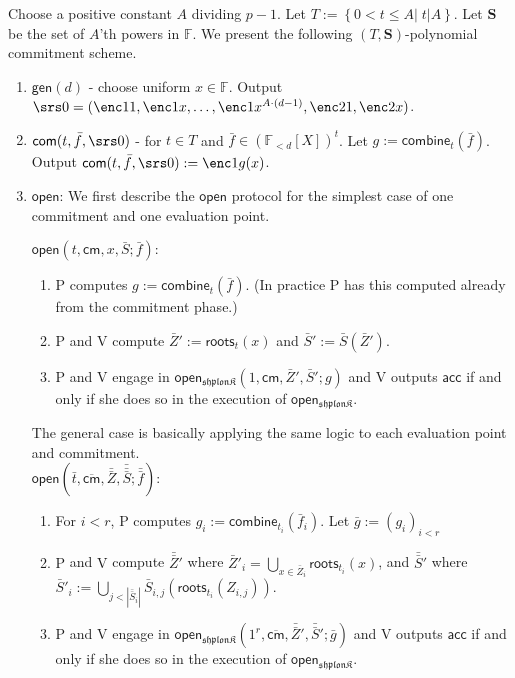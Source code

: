 \documentclass[11pt]{article} %
\newcommand{\F}{\ensuremath{\mathbb F}\xspace}
\newcommand{\vecc}[2]{\ensuremath{(#1)_{#2}}\xspace}
\newcommand{\com}{\ensuremath{\mathsf{com}}\xspace}
\newcommand{\cm}{\ensuremath{\mathsf{cm}}\xspace}
\newcommand{\cmm}{\ensuremath{\mathsf{\overline{cm}}}\xspace}
\newcommand{\open}{\ensuremath{\mathsf{open}}\xspace}
\newcommand{\acc}{\ensuremath{\mathsf{acc}}\xspace}
\newcommand{\defeq}{:=}
\newcommand{\gen}{\ensuremath{\mathsf{gen}}\xspace}
\newcommand{\prvpc}{\ensuremath{\mathrm{P}}\xspace}%
\newcommand{\verpc}{\ensuremath{\mathrm{V}}\xspace}%
\newcommand{\shplonk}{\ensuremath{\mathfrak{sh}\mathfrak{p}\mathfrak{lon}\mathfrak{K}}\xspace}
\newcommand{\set}[1]{\ensuremath{\left\{#1\right\}}\xspace}
\newcommand{\polyvecs}[2]{\ensuremath{(\F_{< #1}[X])^{#2}}\xspace}
\newcommand{\Z}{\mathbb{Z}}
\newcommand{\openset}{\ensuremath{\mathbf{S}}\xspace}
\newcommand{\combine}[2]{\ensuremath{\mathsf{combine}_{#1}(#2)}\xspace}
\newcommand{\roots}[2]{\ensuremath{\mathsf{roots}_{#1}(#2)}\xspace}
\newcommand{\f}{\ensuremath{\bar{f}}\xspace}
\renewcommand{\t}{\ensuremath{\bar{t}}\xspace}
\newcommand{\ff}{\ensuremath{\bar{\bar{f}}}\xspace}
\renewcommand{\g}{\ensuremath{\bar{g}}\xspace}
\renewcommand{\S}{\ensuremath{\bar{S}}\xspace}
\renewcommand{\Z}{\ensuremath{\bar{Z}}\xspace}
\newcommand{\ZZ}{\ensuremath{\bar{\bar{Z}}}\xspace}
\renewcommand{\SS}{\ensuremath{\bar{\bar{S}}}\xspace}
\newcommand{\SSS}{\ensuremath{\bar{\bar{\bar{S}}}}\xspace}
\newcommand{\openshplonk}{\ensuremath{\mathsf{open_{\shplonk}}}\xspace}
\begin{document}
Choose a positive constant $A$ dividing $p-1$. Let $T\defeq \set{0< t\leq A|\; t|A}$. 
Let $\openset$ be the set of $A$'th powers in \F.
We present the following $(T,\openset)$-polynomial commitment scheme.
\begin{enumerate}
 \item $\gen(d)$ - choose uniform $x\in \F$. Output $\srs0 =(\enc1{1},\enc1{x},\ldots,\enc1{x^{A\cdot (d-1)}},\enc2{1},\enc2{x})$.
 \item   $\com(t,\f,\srs0)$ -  for $t\in T$ and $\f\in \polyvecs{d}{t}$. Let $g\defeq \combine{t}{\f}$. Output $\com(t,\f,\srs0) \defeq \enc1{g(x)}$.
 
 \item \open:
 We first describe the \open protocol for the simplest case of one commitment and one evaluation point.
 
 $\open\left(t,\cm,x,\S;\f\right)$:
 \begin{enumerate}
  \item \prvpc computes $g\defeq \combine{t}{\f}$. (In practice \prvpc has this computed already from the commitment phase.)
  \item \prvpc and \verpc compute $\Z' \defeq \roots{t}{x}$ and $\S'\defeq \S(\Z')$.
  \item \prvpc and \verpc engage in $\openshplonk(1,\cm,\Z',\S';g)$
and \verpc outputs \acc if and only if she does so in the execution of \openshplonk.    
  \end{enumerate}
  
The general case is basically applying the same logic to each evaluation point and commitment. \\
 $\open\left(\t,\cmm,\ZZ,\SSS;\ff\right)$:
 \begin{enumerate}
  \item For $i<r$, \prvpc computes $g_i\defeq \combine{t_i}{\f_i}$. Let $\g\defeq \vecc{g_i}{i<r}$
  \item \prvpc and \verpc compute $\ZZ'$ where $\Z'_i = \bigcup_{x\in \Z_i}{\roots{t_i}{x}} $, and  $\SS'$ where $\S'_{i}\defeq \bigcup_{j<|\SS_i|} \S_{i,j}(\roots{t_i}{Z_{i,j}})$.
  \item \prvpc and \verpc engage in $\openshplonk(1^r,\cmm,\ZZ',\SS';\g)$ and \verpc outputs \acc if and only if she does so in the execution of \openshplonk.    
  \end{enumerate}
  

 \end{enumerate}
\end{document}
